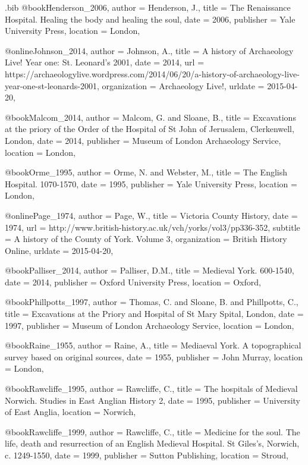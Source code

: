 \begin{filecontents}{\IJSRAidentifier.bib}
@book{Henderson_2006,
	author = {Henderson, J.},
	title = {The Renaissance Hospital. Healing the body and healing the soul},
	date = {2006},
	publisher = {Yale University Press},
	location = {London},
}

@online{Johnson_2014,
	author = {Johnson, A.},
	title = {A history of Archaeology Live! Year one: St. Leonard’s 2001},
	date = {2014},
	url = {https://archaeologylive.wordpress.com/2014/06/20/a-history-of-archaeology-live-year-one-st-leonards-2001},
	organization = {Archaeology Live!},
	urldate = {2015-04-20},
}

@book{Malcom_2014,
	author = {Malcom, G. and Sloane, B.},
	title = {Excavations at the priory of the Order of the Hospital of St John of Jerusalem, Clerkenwell, London},
	date = {2014},
	publisher = {Museum of London Archaeology Service},
	location = {London},
}

@book{Orme_1995,
	author = {Orme, N. and Webster, M.},
	title = {The English Hospital. 1070-1570},
	date = {1995},
	publisher = {Yale University Press},
	location = {London},
}

@online{Page_1974,
	author = {Page, W.},
	title = {Victoria County History},
	date = {1974},
	url = {http://www.british-history.ac.uk/vch/yorks/vol3/pp336-352},
	subtitle = {A history of the County of York. Volume 3},
	organization = {British History Online},
	urldate = {2015-04-20},
}

@book{Palliser_2014,
	author = {Palliser, D.M.},
	title = {Medieval York. 600-1540},
	date = {2014},
	publisher = {Oxford University Press},
	location = {Oxford},
}

@book{Phillpotts_1997,
	author = {Thomas, C. and Sloane, B. and Phillpotts, C.},
	title = {Excavations at the Priory and Hospital of St Mary Spital, London},
	date = {1997},
	publisher = {Museum of London Archaeology Service},
	location = {London},
}

@book{Raine_1955,
	author = {Raine, A.},
	title = {Mediaeval York. A topographical survey based on original sources},
	date = {1955},
	publisher = {John Murray},
	location = {London},
}

@book{Rawcliffe_1995,
	author = {Rawcliffe, C.},
	title = {The hospitals of Medieval Norwich. Studies in East Anglian History 2},
	date = {1995},
	publisher = {University of East Anglia},
	location = {Norwich},
}

@book{Rawcliffe_1999,
	author = {Rawcliffe, C.},
	title = {Medicine for the soul. The life, death and resurrection of an English Medieval Hospital. St Giles’s, Norwich, c. 1249-1550},
	date = {1999},
	publisher = {Sutton Publishing},
	location = {Stroud},
}


\end{filecontents}
